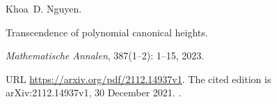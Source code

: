 Khoa~D. Nguyen.

\newblock Transcendence of polynomial canonical heights.

\newblock \emph{Mathematische Annalen}, 387(1--2): 1--15, 2023.

\newblock URL \url{https://arxiv.org/pdf/2112.14937v1}.
\newblock The cited edition is arXiv:2112.14937v1, 30 December 2021.
\newblock {}.